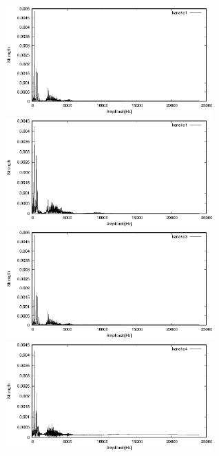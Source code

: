 \documentclass[titlepage]{jarticle}
\begin{document}
\begin{figure}[H]
  \begin{minipage}{0.495\hsize}
    \centering
    \includegraphics[width=8cm]{img/kanako1.eps}
    \caption{}
    \label{kanako1}
  \end{minipage}
  \begin{minipage}{0.495\hsize}
    \centering
    \includegraphics[width=8cm]{img/kanako2.eps}
    \caption{}
    \label{kanako2}
  \end{minipage}

  \begin{minipage}{0.495\hsize}
    \centering
    \includegraphics[width=8cm]{img/kanako3.eps}
    \caption{}
    \label{kanako3}
  \end{minipage}
  \begin{minipage}{0.495\hsize}
    \centering
    \includegraphics[width=8cm]{img/kanako4.eps}
    \caption{}
    \label{kanako4}
  \end{minipage}
\end{figure}
\end{document}

